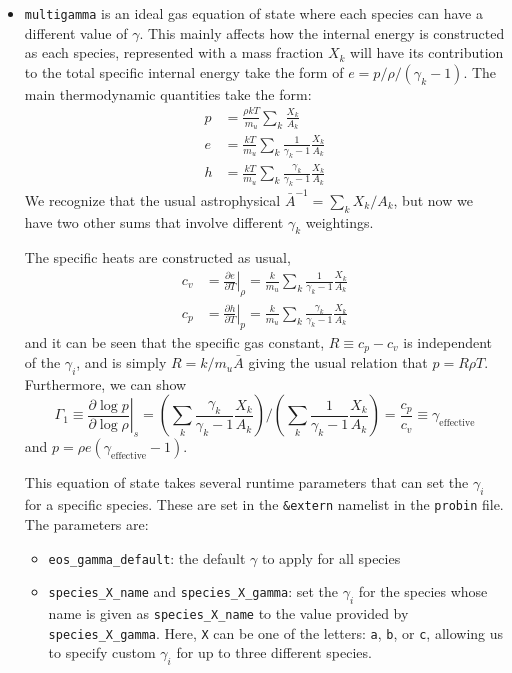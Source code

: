 \documentclass[11pt]{book}
\begin{document}
\begin{itemize}
\item {\tt multigamma} is an ideal gas equation of state where each
  species can have a different value of $\gamma$.  This mainly affects
  how the internal energy is constructed as each species, represented
  with a mass fraction $X_k$ will have its contribution to the total
  specific internal energy take the form of $e = p/\rho/(\gamma_k -
  1)$.  The main thermodynamic quantities take the form:
\begin{align}
p &= \frac{\rho k T}{m_u} \sum_k \frac{X_k}{A_k} \\
e &= \frac{k T}{m_u} \sum_k \frac{1}{\gamma_k - 1} \frac{X_k}{A_k} \\
h &= \frac{k T}{m_u} \sum_k \frac{\gamma_k}{\gamma_k - 1} \frac{X_k}{A_k}
\end{align}
We recognize that the usual astrophysical $\bar{A}^{-1} = \sum_k
X_k/A_k$, but now we have two other sums that involve different
$\gamma_k$ weightings.

The specific heats are constructed as usual, 
\begin{align}
c_v &= \left . \frac{\partial e}{\partial T} \right |_\rho = 
    \frac{k}{m_u} \sum_k \frac{1}{\gamma_k - 1} \frac{X_k}{A_k} \\
c_p &= \left . \frac{\partial h}{\partial T} \right |_p = 
    \frac{k}{m_u} \sum_k \frac{\gamma_k}{\gamma_k - 1} \frac{X_k}{A_k} 
\end{align}
and it can be seen that the specific gas constant, $R \equiv c_p - c_v$ is
independent of the $\gamma_i$, and is simply $R = k/m_u\bar{A}$ giving the
usual relation that $p = R\rho T$.  Furthermore, we can show
\begin{equation}
\Gamma_1 \equiv \left . \frac{\partial \log p}{\partial \log \rho} \right |_s =  
   \left ( \sum_k \frac{\gamma_k}{\gamma_k - 1} \frac{X_k}{A_k} \right ) \bigg /
   \left ( \sum_k \frac{1}{\gamma_k - 1} \frac{X_k}{A_k} \right ) =
\frac{c_p}{c_v} \equiv \gamma_\mathrm{effective} 
\end{equation}
and $p = \rho e (\gamma_\mathrm{effective} - 1)$.

This equation of state takes several runtime parameters that can set the
$\gamma_i$ for a specific species.  These are set in the {\tt \&extern}
namelist in the {\tt probin} file.  The parameters are:
\begin{itemize}
\item {\tt eos\_gamma\_default}: the default $\gamma$ to apply for
  all species
\item {\tt species\_X\_name} and {\tt species\_X\_gamma}: set the $\gamma_i$
  for the species whose name is given as {\tt species\_X\_name} to the
  value provided by {\tt species\_X\_gamma}.  Here, {\tt X} can be one
  of the letters: {\tt a}, {\tt b}, or {\tt c}, allowing us to specify
  custom $\gamma_i$ for up to three different species.
\end{itemize}


\end{itemize}
\end{document}
